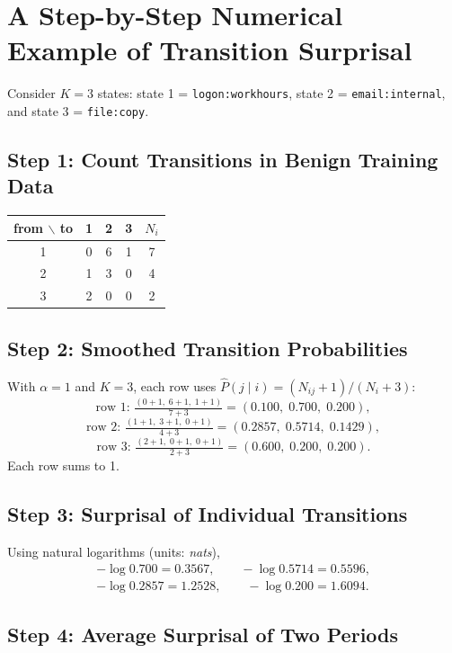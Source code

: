 \section{A Step-by-Step Numerical Example of Transition Surprisal}

Consider $K=3$ states: state 1 = \texttt{logon:workhours}, state 2 = \texttt{email:internal},
and state 3 = \texttt{file:copy}.

\subsection{Step 1: Count Transitions in Benign Training Data}

\begin{center}
\begin{tabular}{cccc|c}
\toprule
from $\backslash$ to & 1 & 2 & 3 & $N_i$ \\
\midrule
1 & 0 & 6 & 1 & 7 \\
2 & 1 & 3 & 0 & 4 \\
3 & 2 & 0 & 0 & 2 \\
\bottomrule
\end{tabular}
\end{center}

\subsection{Step 2: Smoothed Transition Probabilities}

With $\alpha = 1$ and $K = 3$, each row uses $\hat{P}(j\mid i) = (N_{ij}+1)/(N_i+3)$:
\[
\text{row 1: } \tfrac{(0+1,\;6+1,\;1+1)}{7+3} = (0.100,\; 0.700,\; 0.200),
\]
\[
\text{row 2: } \tfrac{(1+1,\;3+1,\;0+1)}{4+3} = (0.2857,\; 0.5714,\; 0.1429),
\]
\[
\text{row 3: } \tfrac{(2+1,\;0+1,\;0+1)}{2+3} = (0.600,\; 0.200,\; 0.200).
\]
Each row sums to 1.

\subsection{Step 3: Surprisal of Individual Transitions}

Using natural logarithms (units: \emph{nats}),
\begin{gather*}
-\log 0.700 = 0.3567, \qquad -\log 0.5714 = 0.5596, \\
-\log 0.2857 = 1.2528, \qquad -\log 0.200 = 1.6094.
\end{gather*}

\subsection{Step 4: Average Surprisal of Two Periods}


